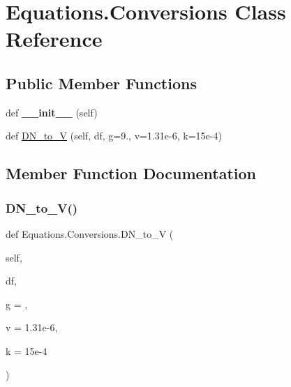 \hypertarget{class_equations_1_1_conversions}{}\section{Equations.\+Conversions Class Reference}
\label{class_equations_1_1_conversions}
\subsection*{Public Member Functions}
\begin{DoxyCompactItemize}
\item 
\mbox{\label{class_equations_1_1_conversions_a8910645b1e346ed2364d7778b472f5fc}} 
def {\bfseries \+\_\+\+\_\+init\+\_\+\+\_\+} (self)
\item 
def \hyperlink{class_equations_1_1_conversions_aff525ca1a15ef252b71537509b71b001}{D\+N\+\_\+to\+\_\+V} (self, df, g=9., v=1.\+31e-\/6, k=15e-\/4)
\end{DoxyCompactItemize}


\subsection{Member Function Documentation}
\mbox{\label{class_equations_1_1_conversions_aff525ca1a15ef252b71537509b71b001}} 
\subsubsection{\texorpdfstring{D\+N\+\_\+to\+\_\+\+V()}{DN\_to\_V()}}
{\footnotesize\ttfamily def Equations.\+Conversions.\+D\+N\+\_\+to\+\_\+V (\begin{DoxyParamCaption}\item[{}]{self,  }\item[{}]{df,  }\item[{}]{g = {},  }\item[{}]{v = {\ttfamily 1.31e-\/6},  }\item[{}]{k = {\ttfamily 15e-\/4} }\end{DoxyParamCaption})}

